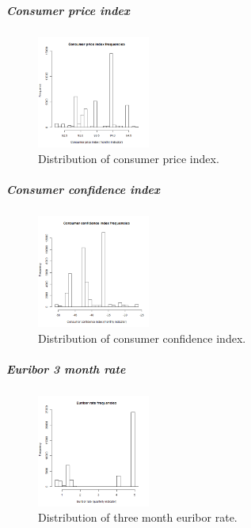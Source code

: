 \documentclass[11pt,]{article}
\let\oldsubparagraph\subparagraph
\renewcommand{\subparagraph}[1]{\oldsubparagraph{#1}\mbox{}}
\begin{document}
\begin{multicols}{2}
\hypertarget{consumer-price-index}{%
\subparagraph{Consumer price index}\label{consumer-price-index}}

\begin{figure}[H]
    \centering
    \includegraphics[width=0.33\textwidth]{images/consumer_price_index}
    \caption{Distribution of consumer price index.}
    \label{fig:cons_price_idx}
\end{figure}

\hypertarget{consumer-confidence-index}{%
\subparagraph{Consumer confidence
index}\label{consumer-confidence-index}}

\begin{figure}[H]
    \centering
    \includegraphics[width=0.33\textwidth]{images/consumer_confidence_index}
    \caption{Distribution of consumer confidence index.}
    \label{fig:cons_conf_idx}
\end{figure}

\hypertarget{euribor-3-month-rate}{%
\subparagraph{Euribor 3 month rate}\label{euribor-3-month-rate}}

\begin{figure}[H]
    \centering
    \includegraphics[width=0.33\textwidth]{images/euribor3m}
    \caption{Distribution of three month euribor rate.}
    \label{fig:euribor3m}
\end{figure}


\end{multicols}
\end{document}

